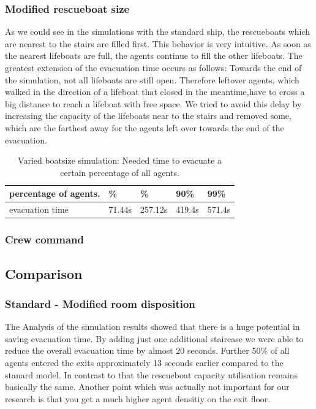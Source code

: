 \documentclass[11pt]{article}
\begin{document}
\subsubsection{Modified rescueboat size}
As we could see in the simulations with the standard ship, the rescueboats which are nearest to the stairs are filled first. This behavior is very intuitive. As soon as the nearest lifeboats are full, the agents continue to fill the other lifeboats. 
The greatest extension of the evacuation time occurs as follows:
Towards the end of the simulation, not all lifeboats are still open. Therefore leftover agents, which walked in the direction of a lifeboat that closed in the meantime,have to cross a big distance to reach a lifeboat with free space.\newline
We tried to avoid this delay by increasing the capacity of the lifeboats near to the stairs and removed some, which are the farthest away for the agents left over towards the end of the evacuation.



\begin{table}[h]
\centering
\begin{tabular}
{|>{\large}m{2cm} |>{\center}b{1.1cm} |>{\center}b{1.1cm}|>{}b{1.1cm}|>{}b{1.1cm}|} \hline \hline
percentage of agents.& 10\% &  50\% & 90\% & 99\% \\ \hline
evacuation time & 71.44s &257.12s & 419.4s & 571.4s \\ \hline \hline
\end{tabular}
\caption{Varied boatsize simulation: Needed time to evacuate a certain percentage of all agents.}
\end{table}



\subsubsection{Crew command}
\subsection{Comparison}
\subsubsection{Standard - Modified room disposition}
The Analysis of the simulation results showed that there is a huge potential in saving evacuation time. By adding just one additional staircase we were able to reduce the overall evacuation time by almost 20 seconds. Further 50\% of all agents entered the exits approximately 13 seconds earlier compared to the stanard model. In contrast to that the rescueboat capacity utilisation remains basically the same. Another point which was actually not important for our research is that you get a much higher agent densitiy on the exit floor. 
\end{document}
